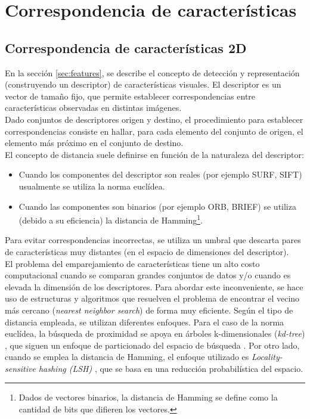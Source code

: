 \section{Correspondencia de características}

\subsection{Correspondencia de características 2D}
En la sección \ref{sec:features}, se describe el concepto de detección y representación (construyendo un descriptor) de características visuales. El descriptor es un vector de tamaño fijo, que permite establecer correspondencias entre características observadas en distintas imágenes. \\
Dado conjuntos de descriptores origen y destino, el procedimiento para establecer correspondencias consiste en hallar, para cada elemento del conjunto de origen, el elemento más próximo en el conjunto de destino.\\

El concepto de distancia suele definirse en función de la naturaleza del descriptor:
\begin{itemize}

\item Cuando los componentes del descriptor son reales (por ejemplo SURF, SIFT) usualmente se utiliza la norma euclídea.

\item Cuando las componentes son binarios (por ejemplo ORB, BRIEF) se utiliza (debido a su eficiencia) la distancia de Hamming\footnote{Dados de vectores binarios, la distancia de Hamming se define como la cantidad de bits que difieren los vectores.}.

\end{itemize}

Para evitar correspondencias incorrectas, se utiliza un umbral que descarta pares de características muy distantes (en el espacio de dimensiones del descriptor). \\
El problema del emparejamiento de características tiene un alto costo computacional cuando se comparan grandes conjuntos de datos y/o cuando es elevada la dimensión de los descriptores. Para abordar este inconveniente, se hace uso de estructuras y algoritmos que resuelven el problema de encontrar el vecino más cercano (\textit{nearest neighbor search}) de forma muy eficiente. Según el tipo de distancia empleada, se utilizan diferentes enfoques. Para el caso de la norma euclídea, la búsqueda de proximidad se apoya en árboles k-dimensionales (\textit{kd-tree}) \cite{wiki-kdtree}, que siguen un enfoque de particionado del espacio de búsqueda \cite{wiki-particionado-espacio}. Por otro lado, cuando se emplea la distancia de Hamming, el enfoque utilizado es \textit{Locality-sensitive hashing (LSH)} \cite{wiki-lsh}, que se basa en una reducción probabilística del espacio.

